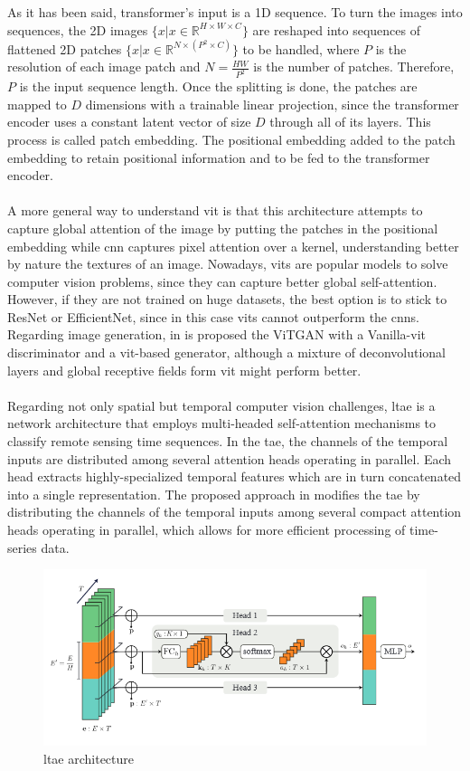 \documentclass[11pt, a4paper]{article}
\begin{document}
	As it has been said, transformer's input is a 1D sequence. To turn the images into sequences, the 2D images $\{x | x \in \mathbb{R} ^{H \times W \times C}\}$ are reshaped into sequences of flattened 2D patches $\{x | x \in \mathbb{R}^{N \times (P^2 \times C)}\}$ to be handled, where $P$ is the resolution of each image patch and $N = \frac{HW}{P^2} $ is the number of patches. Therefore, $P$ is the input sequence length.
	Once the splitting is done, the patches are mapped to $D$ dimensions with a trainable linear projection, since the transformer encoder uses a constant latent vector of size $D$ through all of its layers. This process is called patch embedding. The positional embedding added to the patch embedding to retain positional information and to be fed to the transformer encoder.
	\\\\
	A more general way to understand \gls{vit} is that this architecture attempts to capture global attention of the image by putting the patches in the positional embedding while \gls{cnn} captures pixel attention over a kernel, understanding better by nature the textures of an image. Nowadays, \gls{vit}s are popular models to solve computer vision problems, since they can capture better global self-attention. However, if they are not trained on huge datasets, the best option is to stick to ResNet or EfficientNet, since in this case \gls{vit}s cannot outperform the \gls{cnn}s.
	Regarding image generation, in is proposed the ViTGAN with a Vanilla-\gls{vit} discriminator and a \gls{vit}-based generator, although a mixture of deconvolutional layers and global receptive fields form \gls{vit} might perform better.
	\\\\
	Regarding not only spatial but temporal computer vision challenges, \gls{ltae} is a network architecture that employs multi-headed self-attention mechanisms to classify remote sensing time sequences. In the \gls{tae}, the channels of the temporal inputs are distributed among several attention heads operating in parallel. Each head extracts highly-specialized temporal features which are in turn concatenated into a single representation. The proposed approach in \cite{garnot2021lightweight} modifies the \gls{tae} by distributing the channels of the temporal inputs among several compact attention heads operating in parallel, which allows for more efficient processing of time-series data.
	\begin{figure}[H]
		\centering
		\includegraphics[width=12cm]{imgs/relatedwork/ltae}
		\caption{\gls{ltae} architecture}
	\end{figure}
\end{document}
